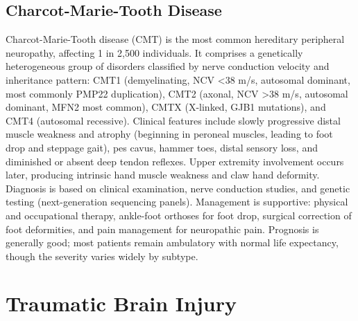 \subsection{Charcot-Marie-Tooth Disease}
\label{sec:Charcot-Marie-Tooth Disease}
Charcot-Marie-Tooth disease (CMT) is the most common hereditary peripheral neuropathy, affecting 1 in 2,500 individuals. It comprises a genetically heterogeneous group of disorders classified by nerve conduction velocity and inheritance pattern: CMT1 (demyelinating, NCV <38 m/s, autosomal dominant, most commonly PMP22 duplication), CMT2 (axonal, NCV >38 m/s, autosomal dominant, MFN2 most common), CMTX (X-linked, GJB1 mutations), and CMT4 (autosomal recessive). Clinical features include slowly progressive distal muscle weakness and atrophy (beginning in peroneal muscles, leading to foot drop and steppage gait), pes cavus, hammer toes, distal sensory loss, and diminished or absent deep tendon reflexes. Upper extremity involvement occurs later, producing intrinsic hand muscle weakness and claw hand deformity. Diagnosis is based on clinical examination, nerve conduction studies, and genetic testing (next-generation sequencing panels). Management is supportive: physical and occupational therapy, ankle-foot orthoses for foot drop, surgical correction of foot deformities, and pain management for neuropathic pain. Prognosis is generally good; most patients remain ambulatory with normal life expectancy, though the severity varies widely by subtype.

\section{Traumatic Brain Injury}








